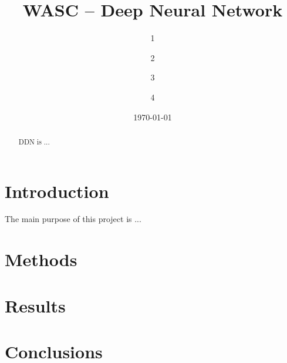 \documentclass[prl,twocolumn]{revtex4-1}
\begin{document}
\title{WASC -- Deep Neural Network}





\author{1}
\author{2}
\author{3}
\author{4}

\date{\today}


\begin{abstract}
DDN is ...




\end{abstract}

\maketitle


\section{Introduction}

The main purpose of this project is ...








 \section{Methods}


 


\section{Results}




\section{Conclusions}



  





\begin{thebibliography}{99}


  
\end{thebibliography}
\end{document}
